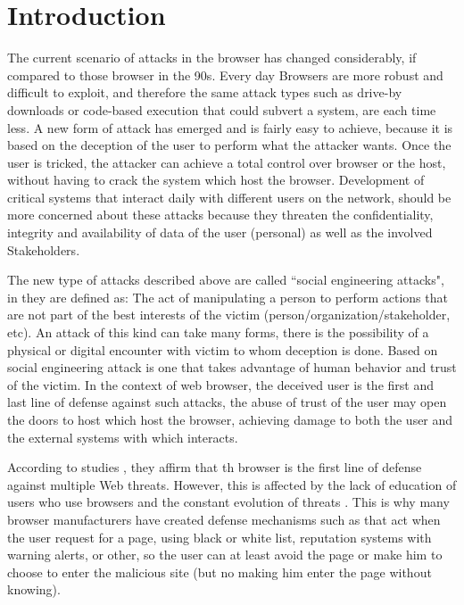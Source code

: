 \documentclass{sig-alternate-05-2015}
\begin{document}





\section*{Introduction}
The current scenario of attacks in the browser has changed considerably, if compared to those browser in the 90s. Every day Browsers are more robust and difficult to exploit, and therefore the same attack types such as drive-by downloads or code-based execution that could subvert a system, are each time less. A new form of attack has emerged and is fairly easy to achieve, because it is based on the deception of the user to perform what the attacker wants. Once the user is tricked, the attacker can achieve a total control over browser or the host, without having to crack the system \cite{Rajab2013,Labs2013} which host the browser. Development of critical systems that interact daily with different users on the network, should be more concerned about these attacks because they threaten the confidentiality, integrity and availability of data of the user (personal) as well as the involved Stakeholders.

The new type of attacks described above are called ``social engineering attacks", in \cite{socEngineering} they are defined as: The act of manipulating a person to perform actions that are not part of the best interests of the victim (person/organization/stakeholder, etc). An attack of this kind can take many forms, there is the possibility of a physical or digital encounter with victim to whom deception is done. Based on social engineering attack is one that takes advantage of human behavior and trust of the victim. In the context of web browser, the deceived user is the first and last line of defense against such attacks, the abuse of trust of the user may open the doors to host which host the browser, achieving damage to both the user and the external systems with which interacts.

According to studies \cite{browSecPhish,Labs2013,rowSecSEMBlock}, they affirm that  th browser is the first line of defense against multiple Web threats. However, this is affected by the lack of education of users who use browsers and the constant evolution of threats \cite{browSecPhish}. This is why many browser manufacturers have created defense mechanisms such as \cite{Drake2011} that act when the user request for a page, using black or white list, reputation systems \cite{Rajab2013} with warning alerts, or other, so the user can at least avoid the page or make him to choose to enter the malicious site (but no making him enter the page without knowing).
\end{document}
